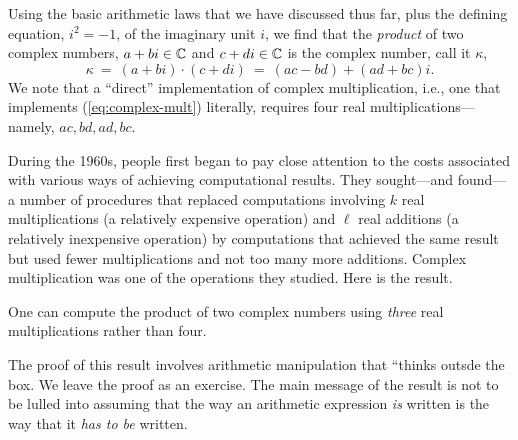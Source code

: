 Using the basic arithmetic laws that we have discussed thus far, plus
the defining equation, $i^2 = -1$, of the imaginary unit $i$, we find
that the {\em product} of two complex numbers, $a+bi \in \mathbb{C}$ and $c+di
\in \mathbb{C}$ is the complex number, call it $\kappa$,
\begin{equation}
\label{eq:complex-mult}
\kappa \ = \ (a+bi) \cdot (c+di) \ = \ (ac - bd) + (ad + bc)i.
\end{equation}
We note that a ``direct'' implementation of complex multiplication,
i.e., one that implements (\ref{eq:complex-mult}) literally, requires
four real multiplications---namely, $ac, bd, ad, bc$.

During the 1960s, people first began to pay close attention to the
costs associated with various ways of achieving computational results.
They sought---and found---a number of procedures that replaced
computations involving $k$ real multiplications (a relatively
expensive operation) and $\ell$ real additions (a relatively
inexpensive operation) by computations that achieved the same result
but used fewer multiplications and not too many more additions.
Complex multiplication was one of the operations they studied.  Here
is the result.

\begin{prop}
\label{thm:complex-mult-3real}
One can compute the product of two complex numbers using {\em three}
real multiplications rather than four.
\end{prop}

The proof of this result involves arithmetic manipulation that
``thinks outsde the box.  We leave the proof as an exercise.  The main
message of the result is not to be lulled into assuming that the way
an arithmetic expression {\em is} written is the way that it {\em has
  to be} written.


